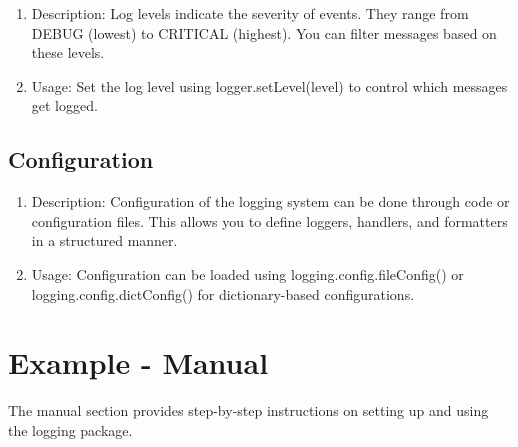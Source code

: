   \begin{enumerate}
    \item Description: Log levels indicate the severity of events. They range from DEBUG (lowest) to CRITICAL (highest). You can filter messages based on these levels.
    
    \item Usage: Set the log level using logger.setLevel(level) to control which messages get logged.\cite{logging_configuration}
  \end{enumerate}
  
\subsection{Configuration}

  \begin{enumerate}
    \item Description: Configuration of the logging system can be done through code or configuration files. This allows you to define loggers, handlers, and formatters in a structured manner.
    \item Usage: Configuration can be loaded using logging.config.fileConfig() or logging.config.dictConfig() for dictionary-based configurations.
  \end{enumerate}

\section{Example - Manual}
The manual section provides step-by-step instructions on setting up and using the logging package.

